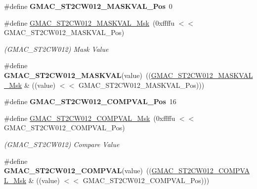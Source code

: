 \begin{DoxyCompactItemize}
\#define {\bfseries G\+M\+A\+C\+\_\+\+S\+T2\+C\+W012\+\_\+\+M\+A\+S\+K\+V\+A\+L\+\_\+\+Pos}~0
\item 
\mbox{\label{group__SAME70__GMAC_gae71b5f1afe11aa266ba544e8866f9b2f}} 
\#define \mbox{\hyperlink{group__SAME70__GMAC_gae71b5f1afe11aa266ba544e8866f9b2f}{G\+M\+A\+C\+\_\+\+S\+T2\+C\+W012\+\_\+\+M\+A\+S\+K\+V\+A\+L\+\_\+\+Msk}}~(0xffffu $<$$<$ G\+M\+A\+C\+\_\+\+S\+T2\+C\+W012\+\_\+\+M\+A\+S\+K\+V\+A\+L\+\_\+\+Pos)
\begin{DoxyCompactList}\small\item\em (G\+M\+A\+C\+\_\+\+S\+T2\+C\+W012) Mask Value \end{DoxyCompactList}\item 
\mbox{\label{group__SAME70__GMAC_ga030b951682387a33da498bd1502d7537}} 
\#define {\bfseries G\+M\+A\+C\+\_\+\+S\+T2\+C\+W012\+\_\+\+M\+A\+S\+K\+V\+AL}(value)~((\mbox{\hyperlink{group__SAMV71__GMAC_gae71b5f1afe11aa266ba544e8866f9b2f}{G\+M\+A\+C\+\_\+\+S\+T2\+C\+W012\+\_\+\+M\+A\+S\+K\+V\+A\+L\+\_\+\+Msk}} \& ((value) $<$$<$ G\+M\+A\+C\+\_\+\+S\+T2\+C\+W012\+\_\+\+M\+A\+S\+K\+V\+A\+L\+\_\+\+Pos)))
\item 
\mbox{\label{group__SAME70__GMAC_ga7a41278dd4751d8f47f93398a1bb028c}} 
\#define {\bfseries G\+M\+A\+C\+\_\+\+S\+T2\+C\+W012\+\_\+\+C\+O\+M\+P\+V\+A\+L\+\_\+\+Pos}~16
\item 
\mbox{\label{group__SAME70__GMAC_ga1423baba169c67aa4e56a5af8b37c930}} 
\#define \mbox{\hyperlink{group__SAME70__GMAC_ga1423baba169c67aa4e56a5af8b37c930}{G\+M\+A\+C\+\_\+\+S\+T2\+C\+W012\+\_\+\+C\+O\+M\+P\+V\+A\+L\+\_\+\+Msk}}~(0xffffu $<$$<$ G\+M\+A\+C\+\_\+\+S\+T2\+C\+W012\+\_\+\+C\+O\+M\+P\+V\+A\+L\+\_\+\+Pos)
\begin{DoxyCompactList}\small\item\em (G\+M\+A\+C\+\_\+\+S\+T2\+C\+W012) Compare Value \end{DoxyCompactList}\item 
\mbox{\label{group__SAME70__GMAC_gacf369867ba31e5267dd42dc22e065b3d}} 
\#define {\bfseries G\+M\+A\+C\+\_\+\+S\+T2\+C\+W012\+\_\+\+C\+O\+M\+P\+V\+AL}(value)~((\mbox{\hyperlink{group__SAMV71__GMAC_ga1423baba169c67aa4e56a5af8b37c930}{G\+M\+A\+C\+\_\+\+S\+T2\+C\+W012\+\_\+\+C\+O\+M\+P\+V\+A\+L\+\_\+\+Msk}} \& ((value) $<$$<$ G\+M\+A\+C\+\_\+\+S\+T2\+C\+W012\+\_\+\+C\+O\+M\+P\+V\+A\+L\+\_\+\+Pos)))

\end{DoxyCompactItemize}
